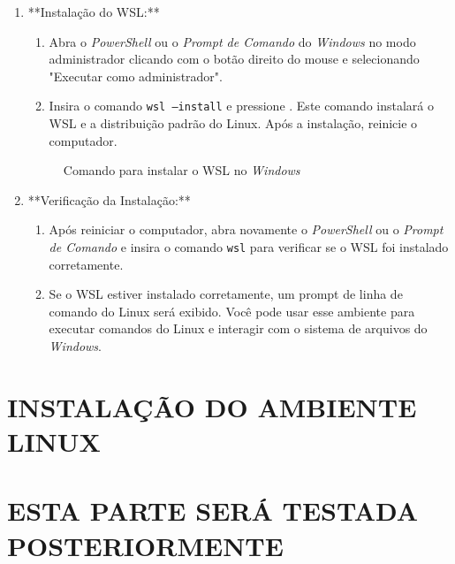 \documentclass[a4paper,11pt]{article}
\newcommand{\windows}{\textit{Windows}}
\begin{document}
\begin{enumerate}
	
	\item **Instalação do WSL:**
	\begin{enumerate}
		\item Abra o \textit{PowerShell} ou o \textit{Prompt de Comando} do \windows{} no modo administrador clicando com o botão direito do mouse e selecionando "Executar como administrador".
		\item Insira o comando \texttt{wsl --install} e pressione . Este comando instalará o WSL e a distribuição padrão do Linux. Após a instalação, reinicie o computador.
	\end{enumerate}
	
	\begin{figure}[H]
		\centering
		\caption{Comando para instalar o WSL no \windows{}}\label{fig:prompt_wsl}
	\end{figure}
	
	\item **Verificação da Instalação:**
	\begin{enumerate}
		\item Após reiniciar o computador, abra novamente o \textit{PowerShell} ou o \textit{Prompt de Comando} e insira o comando \texttt{wsl} para verificar se o WSL foi instalado corretamente.
		\item Se o WSL estiver instalado corretamente, um prompt de linha de comando do Linux será exibido. Você pode usar esse ambiente para executar comandos do Linux e interagir com o sistema de arquivos do \windows{}.
	\end{enumerate}
	
\end{enumerate}


\section{INSTALAÇÃO DO AMBIENTE LINUX}

\section*{\color{red}ESTA PARTE SERÁ TESTADA POSTERIORMENTE}
\end{document}
